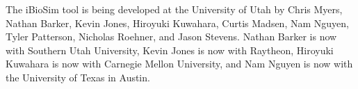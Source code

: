 \documentclass[titlepage,11pt]{article}
\begin{document}
\noindent
The iBioSim tool is being developed at the University of Utah
by 
Chris Myers, 
Nathan Barker, 
Kevin Jones, 
Hiroyuki Kuwahara, 
Curtis Madsen, 
Nam Nguyen, 
Tyler Patterson, 
Nicholas Roehner, 
and
Jason Stevens.  
Nathan Barker is now with Southern Utah University, Kevin Jones is now with Raytheon, Hiroyuki Kuwahara is now with Carnegie Mellon University, and Nam Nguyen is now with the University of Texas in Austin.
\end{document}
